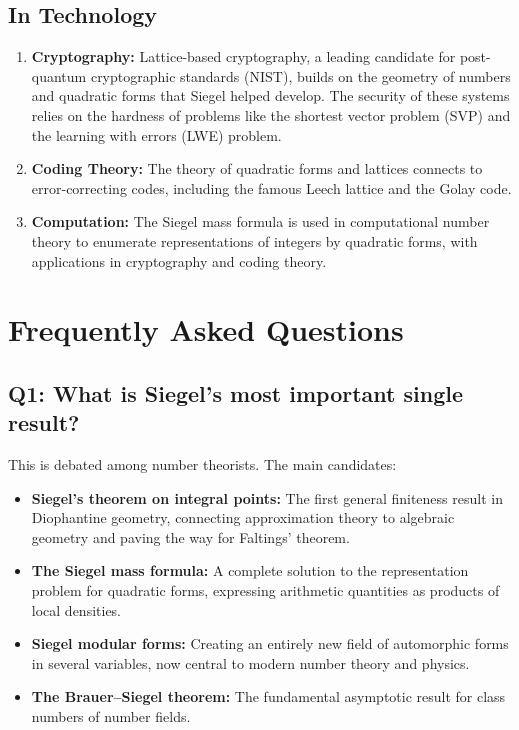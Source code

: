 \subsection{In Technology}

\begin{enumerate}
    \item \textbf{Cryptography:} Lattice-based cryptography, a leading candidate for post-quantum cryptographic standards (NIST), builds on the geometry of numbers and quadratic forms that Siegel helped develop. The security of these systems relies on the hardness of problems like the shortest vector problem (SVP) and the learning with errors (LWE) problem.
    
    \item \textbf{Coding Theory:} The theory of quadratic forms and lattices connects to error-correcting codes, including the famous Leech lattice and the Golay code.
    
    \item \textbf{Computation:} The Siegel mass formula is used in computational number theory to enumerate representations of integers by quadratic forms, with applications in cryptography and coding theory.
\end{enumerate}

\section{Frequently Asked Questions}

\subsection*{Q1: What is Siegel's most important single result?}

This is debated among number theorists. The main candidates:
\begin{itemize}
    \item \textbf{Siegel's theorem on integral points:} The first general finiteness result in Diophantine geometry, connecting approximation theory to algebraic geometry and paving the way for Faltings' theorem.
    \item \textbf{The Siegel mass formula:} A complete solution to the representation problem for quadratic forms, expressing arithmetic quantities as products of local densities.
    \item \textbf{Siegel modular forms:} Creating an entirely new field of automorphic forms in several variables, now central to modern number theory and physics.
    \item \textbf{The Brauer--Siegel theorem:} The fundamental asymptotic result for class numbers of number fields.
\end{itemize}

